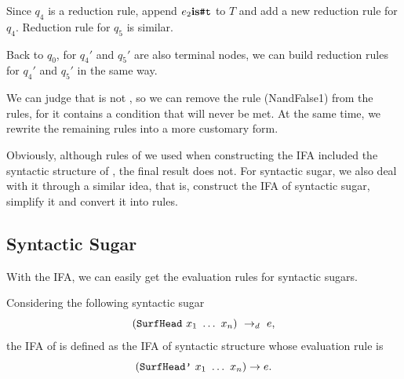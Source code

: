 
Since $q_4$ is a reduction rule, append $e_2 \mbox{\rm \bf is} \mbox{\tt \#t}$ to $T$ and add a new reduction rule for $q_4$. Reduction rule for $q_5$ is similar.



Back to $q_0$, for $q_4'$ and $q_5'$ are also terminal nodes, we can build reduction rules for $q_4'$ and $q_5'$ in the same way.



We can judge that  is not , so we can remove the rule (NandFalse1) from the rules, for it contains a condition that will never be met. At the same time, we rewrite the remaining rules into a more customary form.


Obviously, although rules of  we used when constructing the IFA included the syntactic structure of , the final result does not. For syntactic sugar, we also deal with it through a similar idea, that is, construct the IFA of syntactic sugar, simplify it and convert it into rules.

\subsection{Syntactic Sugar}

With the IFA, we can easily get the evaluation rules for syntactic sugars.

\begin{Def}

Considering the following syntactic sugar
\[
(\mbox{\tt SurfHead}~x_1~\ldots~x_n) ~\rightarrow_d~ e,
\]
the IFA of  is defined as the IFA of syntactic structure  whose evaluation rule is
\[
(\mbox{\tt SurfHead'}~x_1~\ldots~x_n)\rightarrow e.
\]

\end{Def}

